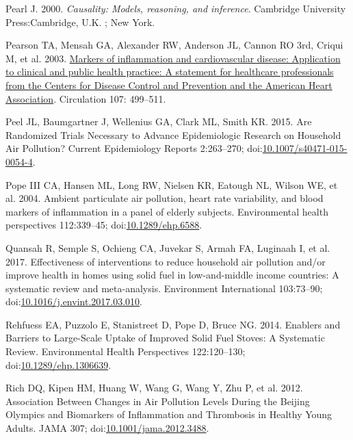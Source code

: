 \documentclass[
  letterpaper,
  DIV=11,
  numbers=noendperiod]{scrartcl}
\newlength{\cslhangindent}
\newenvironment{CSLReferences}[2] %
 {\begin{list}{}{%
  \setlength{\itemindent}{0pt}
  \setlength{\leftmargin}{0pt}
  \setlength{\parsep}{0pt}
  \ifodd #1
   \setlength{\leftmargin}{\cslhangindent}
   \setlength{\itemindent}{-1\cslhangindent}
  \fi
  \setlength{\itemsep}{#2\baselineskip}}}
 {\end{list}}
\begin{document}
\begin{CSLReferences}{1}{1}
Pearl J. 2000. \emph{Causality: Models, reasoning, and inference}.
Cambridge University Press:Cambridge, U.K. ; New York.

Pearson TA, Mensah GA, Alexander RW, Anderson JL, Cannon RO 3rd, Criqui
M, et al. 2003.
\href{https://www.ncbi.nlm.nih.gov/pubmed/12551878}{Markers of
inflammation and cardiovascular disease: Application to clinical and
public health practice: {A} statement for healthcare professionals from
the {Centers} for {Disease Control} and {Prevention} and the {American
Heart Association}}. Circulation 107: 499--511.

Peel JL, Baumgartner J, Wellenius GA, Clark ML, Smith KR. 2015. Are
{Randomized Trials Necessary} to {Advance Epidemiologic Research} on
{Household Air Pollution}? Current Epidemiology Reports 2:263--270;
doi:\href{https://doi.org/10.1007/s40471-015-0054-4}{10.1007/s40471-015-0054-4}.

Pope III CA, Hansen ML, Long RW, Nielsen KR, Eatough NL, Wilson WE, et
al. 2004. Ambient particulate air pollution, heart rate variability, and
blood markers of inflammation in a panel of elderly subjects.
Environmental health perspectives 112:339--45;
doi:\href{https://doi.org/10.1289/ehp.6588}{10.1289/ehp.6588}.

Quansah R, Semple S, Ochieng CA, Juvekar S, Armah FA, Luginaah I, et al.
2017. Effectiveness of interventions to reduce household air pollution
and/or improve health in homes using solid fuel in low-and-middle income
countries: {A} systematic review and meta-analysis. Environment
International 103:73--90;
doi:\href{https://doi.org/10.1016/j.envint.2017.03.010}{10.1016/j.envint.2017.03.010}.

Rehfuess EA, Puzzolo E, Stanistreet D, Pope D, Bruce NG. 2014. Enablers
and {Barriers} to {Large-Scale Uptake} of {Improved Solid Fuel Stoves}:
{A Systematic Review}. Environmental Health Perspectives 122:120--130;
doi:\href{https://doi.org/10.1289/ehp.1306639}{10.1289/ehp.1306639}.

Rich DQ, Kipen HM, Huang W, Wang G, Wang Y, Zhu P, et al. 2012.
Association {Between Changes} in {Air Pollution Levels During} the
{Beijing Olympics} and {Biomarkers} of {Inflammation} and {Thrombosis}
in {Healthy Young Adults}. JAMA 307;
doi:\href{https://doi.org/10.1001/jama.2012.3488}{10.1001/jama.2012.3488}.


\end{CSLReferences}
\end{document}

